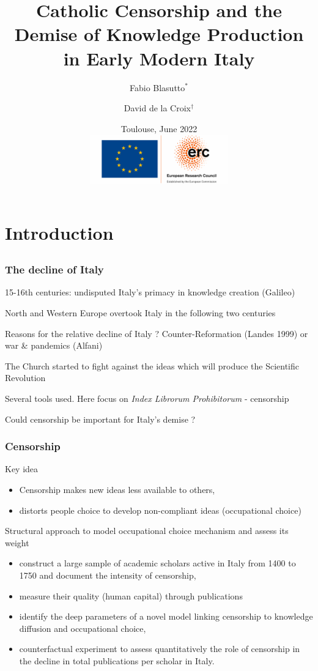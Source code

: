 \documentclass[usepdftitle=false,aspectratio=169,xcolor=dvipsnames]{beamer}
\title{Catholic Censorship and the Demise of Knowledge Production in Early Modern Italy }
\author{Fabio Blasutto\(^{*}\) \and David de la Croix\(^{\dag}\)}
\institute{\(^{*}\)Stockholm School of Economics \quad
\(^{\dag}\)IRES/LIDAM, UCLouvain \& CEPR}
\date{Toulouse, June 2022\\
\vspace{0.5cm}
\includegraphics[width=6cm]{logo-erc.png}}
\begin{document}
	


	\begin{frame}
		\titlepage
	\end{frame}
	
	\section{Introduction}
	\subsection{}
	
	\begin{frame}

\frametitle{The decline of Italy}

15-16th centuries: undisputed Italy's primacy in knowledge creation (Galileo)

 North and Western Europe overtook Italy in the following two centuries

 Reasons for the relative decline of Italy ? Counter-Reformation (Landes 1999) or war \& pandemics (Alfani)

The  Church started to fight against the ideas which will produce the Scientific Revolution

Several tools used. Here focus on \textit{Index Librorum Prohibitorum} - censorship

Could censorship be important for Italy's demise ?

	\end{frame}
	
	\begin{frame}
\frametitle{Censorship}

Key idea
\begin{itemize}
\item Censorship makes new ideas less available to others,
\item distorts people choice to develop non-compliant ideas (occupational choice)
\end{itemize}

Structural approach to model  occupational choice mechanism and assess its weight
\begin{itemize}
\item construct a large sample of academic scholars
active in Italy from 1400 to 1750 and  document  the intensity of censorship,
\item measure their quality (human capital)  through publications
\item  identify the deep parameters of a novel model linking censorship to knowledge diffusion and
occupational choice,
\item  counterfactual experiment to assess quantitatively
the role of censorship in the decline in total publications per scholar in Italy.
\end{itemize}

	\end{frame}
\end{document}

